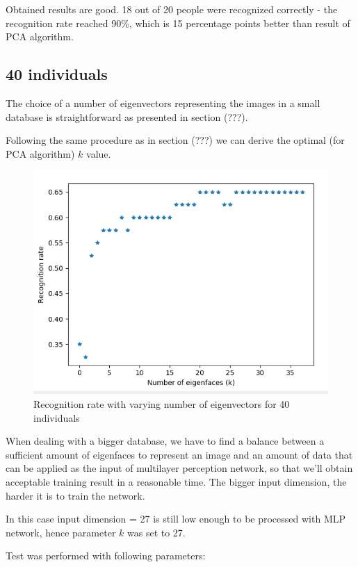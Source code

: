 Obtained results are good. 18 out of 20 people were recognized correctly - the recognition rate reached 90\%, which is 15 percentage points better than result of PCA algorithm.


\subsection{40 individuals}

The choice of a number of eigenvectors representing the images in a small database is straightforward as presented in section (???). 

Following the same procedure as in section (???) we can derive the optimal (for PCA algorithm) $k$ value. 

\begin{figure}[H]
\centering
\includegraphics[scale=0.5]{img/tests/40ppl/PCA_40.png}
\caption{Recognition rate with varying number of eigenvectors for 40 individuals}
\end{figure} 

When dealing with a bigger database, we have to find a balance between a sufficient amount of eigenfaces to represent an image and an amount of data that can be applied as the input of multilayer perception network, so that we'll obtain acceptable training result in a reasonable time. The bigger input dimension, the harder it is to train the network. 

In this case input dimension = 27 is still low enough to be processed with MLP network, hence parameter $k$ was set to 27.

Test was performed with following parameters:

